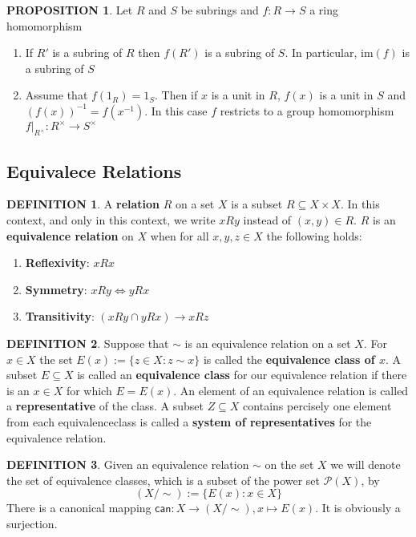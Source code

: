 \documentclass[12pt]{article}
\theoremstyle{definition}
\newtheorem{definition}{DEFINITION}[subsection]
\newtheorem{prop}{PROPOSITION}[subsection]
\begin{document}
\begin{prop}
    Let $R$ and $S$ be subrings and $f:R\rightarrow S$ a ring homomorphism
    \begin{enumerate}
        \item If $R'$ is a subring of $R$ then $f(R')$ is a subring of $S$. In particular, $\text{im}(f)$ is a subring of $S$
        \item Assume that $f(1_R) = 1_S$. Then if $x$ is a unit in  $R$, $f(x)$ is a unit in $S$ and $(f(x))^{-1} = f(x^{-1})$. In this case $f$ restricts to a group homomorphism $f|_{R^\times}:R^\times \rightarrow S^\times$
    \end{enumerate}
\end{prop}

\subsection{Equivalece Relations}
\begin{definition}
    A \textbf{relation} $R$ on a set $X$ is a subset $R \subseteq X \times X$. In this context, and only in this context, we write $xRy$ instead of $(x,y) \in R$. $R$ is an \textbf{equivalence relation} on $X$ when for all $x,y,z \in X$ the following holds:
    \begin{enumerate}
        \item \textbf{Reflexivity}: $xRx$
        \item \textbf{Symmetry}: $xRy \Leftrightarrow yRx$
        \item \textbf{Transitivity}: $(xRy \cap yRx) \rightarrow xRz$
    \end{enumerate}
\end{definition}

\begin{definition}
    Suppose that $\sim$ is an equivalence relation on a set $X$. For $x \in X$ the set $E(x) := \{z \in X: z \sim x\}$ is called the \textbf{equivalence class of $x$}. A subset $E \subseteq X$ is called an \textbf{equivalence class} for our equivalence relation if there is an $x \in X$ for which $E = E(x)$. An element of an equivalence relation is called a \textbf{representative} of the class. A subset $Z \subseteq X$ contains percisely one element from each equivalenceclass is called a \textbf{system of representatives} for the equivalence relation.
\end{definition}

\begin{definition}
    Given an equivalence relation $\sim$ on the set $X$ we will denote the set of equivalence classes, which is a subset of the power set $\mathcal{P}(X)$, by $$(X/\sim) := \{E(x):x\in X\}$$
    There is a canonical mapping $\mathsf{can}: X \rightarrow (X/\sim), x \mapsto E(x).$ It is obviously a surjection.
\end{definition}
\end{document}

